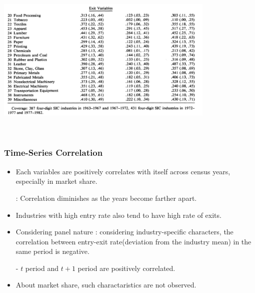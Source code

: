 \documentclass[dvipdfmx,12pt]{beamer}
\begin{document}
\begin{frame}

\begin{center}

\includegraphics[width=10.5cm,height=7.75cm]{DRS_T5b.pdf}

\end{center}

\end{frame}

\begin{frame}\frametitle{Time-Series Correlation}

 \begin{itemize}
 
 \item Each variables are positively correlates with itself across census years, especially in market share.
 
  : Correlation diminishes as the years become farther apart.
 
 \item Industries with high entry rate also tend to have high rate of exits.
 
 \item Considering panel nature :  considering industry-specific characters, the correlation between entry-exit rate(deviation from the industry mean) in the same period is negative.

- $t$ period and $t+1$ period are positively correlated.
 
 \item About market share, such charactaristics are not observed.
 
 \end{itemize}

\end{frame}
\end{document}
